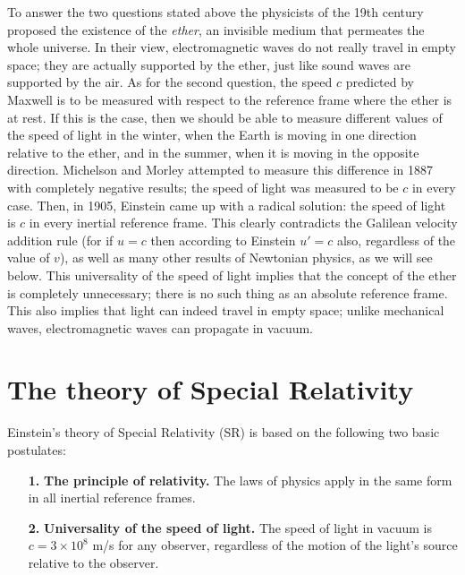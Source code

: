 To answer the two questions stated above the physicists of the 19th century proposed the existence of the {\it ether}, an invisible medium that permeates the whole universe. In their view, electromagnetic waves do not really travel in empty space; they are actually supported by the ether, just like sound waves are supported by the air. As for the second question, the speed $c$ predicted by Maxwell is to be measured with respect to the reference frame where the ether is at rest. If this is the case, then we should be able to measure different values of the speed of light in the winter, when the Earth is moving in one direction relative to the ether, and in the summer, when it is moving in the opposite direction. Michelson and Morley attempted to measure this difference in 1887 with completely negative results; the speed of light was measured to be $c$ in every case. Then, in 1905, Einstein came up with a radical solution: the speed of light is $c$ in every inertial reference frame. This clearly contradicts 
the Galilean velocity addition rule (for if $u=c$ then according to Einstein $u'=c$ also, regardless of the value of $v$), as well as many other results of Newtonian physics, as we will see below. This universality of the speed of light implies that the concept of the ether is completely unnecessary; there is no such thing as an absolute reference frame. This also implies that light can indeed travel in empty space; unlike mechanical waves, electromagnetic waves can propagate in vacuum.


\section{The theory of Special Relativity}

Einstein's theory of Special Relativity (SR) is based on the following two basic postulates:
\begin{itemize}
\item [\bf 1.] {\bf The principle of relativity.} The laws of physics apply in the same form in all inertial reference frames.
\item [\bf 2.] {\bf Universality of the speed of light.} The speed of light in vacuum is $c=3\times10^8$ m/s for any observer, regardless of the motion of the light's source relative to the observer.
\end{itemize}

